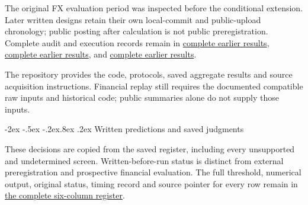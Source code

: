 \documentclass[10pt,a4paper]{article}
\makeatletter
\renewcommand\section{\@startsection{section}{1}{\z@}%
  {-2ex \@plus -.5ex \@minus -.2ex}{.8ex \@plus .2ex}%
  {\normalfont\large\bfseries}}
\makeatother
\begin{document}
The original FX evaluation period was inspected before the conditional extension. Later written designs retain their own local-commit and public-upload chronology; public posting after calculation is not public preregistration. Complete audit and execution records remain in \href{https://github.com/ByronLi0207/financial-mathematics-paper-20261020/blob/submission-final/EXTENDED_RESULTS.md#asmbi-extended-s36}{complete earlier results}, \href{https://github.com/ByronLi0207/financial-mathematics-paper-20261020/blob/submission-final/EXTENDED_RESULTS.md#asmbi-extended-s38}{complete earlier results}, and \href{https://github.com/ByronLi0207/financial-mathematics-paper-20261020/blob/submission-final/EXTENDED_RESULTS.md#asmbi-extended-s39}{complete earlier results}.

The repository provides the code, protocols, saved aggregate results and source acquisition instructions. Financial replay still requires the documented compatible raw inputs and historical code; public summaries alone do not supply those inputs.

\FloatBarrier


\section{Written predictions and saved judgments}\label{sup:submission-predictions}

These decisions are copied from the saved register, including every unsupported and undetermined screen. Written-before-run status is distinct from external preregistration and prospective financial evaluation. The full threshold, numerical output, original status, timing record and source pointer for every row remain in \href{https://github.com/ByronLi0207/financial-mathematics-paper-20261020/blob/submission-final/EXTENDED_RESULTS.md#asmbi-extended-s40}{the complete six-column register}.
\end{document}

